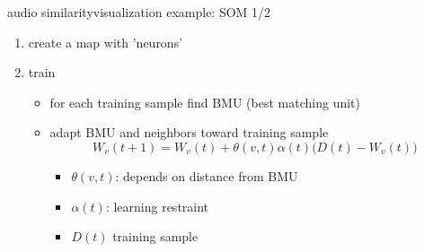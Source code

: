         \begin{frame}{audio similarity}{visualization example: SOM 1/2}
            \vspace{-3mm}
                    \begin{enumerate}
                        \item	create a map with 'neurons'
                        \item<1->	train
                                \begin{itemize}
                                    \item	for each training sample find BMU (best matching unit)
                                    \item	adapt BMU and neighbors toward training sample
                                    \begin{equation*}
                                        W_v(t + 1) = W_v(t) + \theta (v, t) \alpha(t)\big(D(t) - W_v(t)\big)
                                    \end{equation*}
                                    \begin{footnotesize}
                                        \begin{itemize}
                                            \item	$\theta (v, t)$: depends on distance from BMU
                                            \item	$\alpha (t)$: learning restraint
                                            \item	$D(t)$ training sample
                                        \end{itemize}
                                    \end{footnotesize}
                                \end{itemize}
                    \end{enumerate}
        \end{frame}
